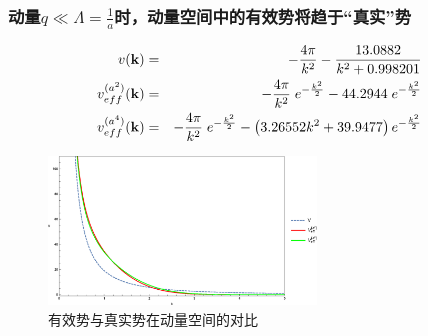 \documentclass[8pt]{beamer}
\begin{document}
\begin{frame}
\frametitle{动量$q\ll\Lambda=\displaystyle\frac{1}{a}$时，动量空间中的有效势将趋于“真实”势}
\footnotesize
\begin{eqnarray}
	v(\vb{k}) &=& -\frac{4 \pi }{k^2}-\frac{13.0882}{k^2+0.998201} \\
	v_{eff}^{(a^2)}(\vb{k}) &=& -\frac{4 \pi }{k^2}\; e^{-\frac{k^2}{2}}-44.2944\; e^{-\frac{k^2}{2}} \\
	v_{eff}^{(a^4)}(\vb{k}) &=& -\frac{4 \pi  }{k^2}\;e^{-\frac{k^2}{2}}-\left(3.26552 k^2+39.9477\right)e^{-\frac{k^2}{2}}
\end{eqnarray}
\begin{figure}[!hbp]
	\centering
	\includegraphics[width=2.8in]{FourierTransformation_1.eps}
	\caption{有效势与真实势在动量空间的对比}\label{TotalFourier}
\end{figure}
\end{frame}
\end{document}
